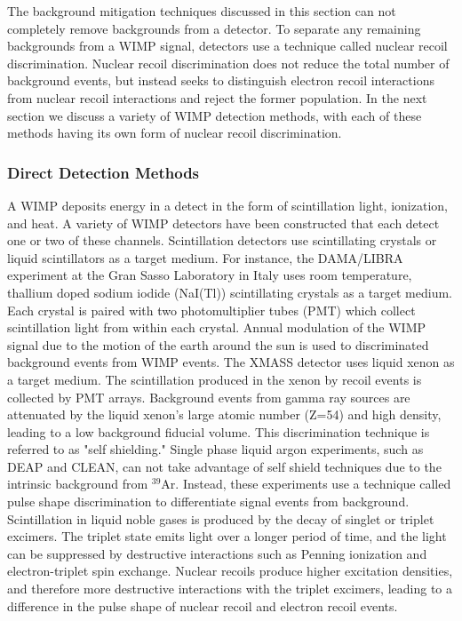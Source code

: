 \documentclass[a4paper,12pt]{article}
\begin{document}
The background mitigation techniques discussed in this section can not completely remove backgrounds from a detector.  To separate any remaining backgrounds from a WIMP signal, detectors use a technique called nuclear recoil discrimination.  Nuclear recoil discrimination does not reduce the total number of background events, but instead seeks to distinguish electron recoil interactions from nuclear recoil interactions and reject the former population.  In the next section we discuss a variety of WIMP detection methods, with each of these methods having its own form of nuclear recoil discrimination. 

\subsubsection{Direct Detection Methods} 
A WIMP deposits energy in a detect in the form of scintillation light, ionization, and heat.  A variety of WIMP detectors have been constructed that each detect one or two of these channels.  Scintillation detectors use scintillating crystals or liquid scintillators as a target medium. For instance, the DAMA/LIBRA experiment at the Gran Sasso Laboratory in Italy uses room temperature, thallium doped sodium iodide (NaI(Tl)) scintillating crystals as a target medium.  Each crystal is paired with two photomultiplier tubes (PMT) which collect scintillation light from within each crystal.  Annual modulation of the WIMP signal due to the motion of the earth around the sun is used to discriminated background events from WIMP events.  The XMASS detector uses liquid xenon as a target medium.  The scintillation produced in the xenon by recoil events is collected by PMT arrays. Background events from gamma ray sources are attenuated by the liquid xenon's large atomic number (Z=54) and high density, leading to a low background fiducial volume.  This discrimination technique is referred to as "self shielding."  Single phase liquid argon experiments, such as DEAP and CLEAN, can not take advantage of self shield techniques due to the intrinsic background from $^{39}$Ar.  Instead, these experiments use a technique called pulse shape discrimination to differentiate signal events from background.  Scintillation in liquid noble gases is produced by the decay of singlet or triplet excimers.  The triplet state emits light over a longer period of time, and the light can be suppressed by destructive interactions such as Penning ionization and electron-triplet spin exchange.  Nuclear recoils produce higher excitation densities, and therefore more destructive interactions with the triplet excimers, leading to a difference in the pulse shape of nuclear recoil and electron recoil events. 
\end{document}
